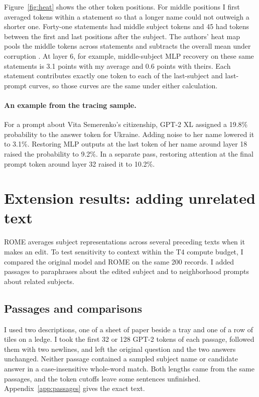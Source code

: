 \documentclass[11pt]{article}
\begin{document}
Figure~\ref{fig:heat} shows the other token positions. For middle positions I first averaged tokens within a statement so that a longer name could not outweigh a shorter one. Forty-one statements had middle subject tokens and 45 had tokens between the first and last positions after the subject. The authors' heat map pools the middle tokens across statements and subtracts the overall mean under corruption \citep{romecode}. At layer 6, for example, middle-subject MLP recovery on these same statements is 3.1 points with my average and 0.6 points with theirs. Each statement contributes exactly one token to each of the last-subject and last-prompt curves, so those curves are the same under either calculation.

\paragraph{An example from the tracing sample.}
For a prompt about Vita Semerenko's citizenship, GPT-2 XL assigned a 19.8\% probability to the answer token for Ukraine. Adding noise to her name lowered it to 3.1\%. Restoring MLP outputs at the last token of her name around layer 18 raised the probability to 9.2\%. In a separate pass, restoring attention at the final prompt token around layer 32 raised it to 10.2\%.

\FloatBarrier
\section{Extension results: adding unrelated text}
ROME averages subject representations across several preceding texts when it makes an edit. To test sensitivity to context within the T4 compute budget, I compared the original model and ROME on the same 200 records. I added passages to paraphrases about the edited subject and to neighborhood prompts about related subjects.

\subsection{Passages and comparisons}
I used two descriptions, one of a sheet of paper beside a tray and one of a row of tiles on a ledge. I took the first 32 or 128 GPT-2 tokens of each passage, followed them with two newlines, and left the original question and the two answers unchanged. Neither passage contained a sampled subject name or candidate answer in a case-insensitive whole-word match. Both lengths came from the same passages, and the token cutoffs leave some sentences unfinished. Appendix~\ref{app:passages} gives the exact text.
\end{document}
